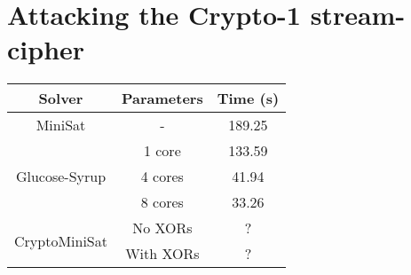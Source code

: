 \section{Attacking the Crypto-1 stream-cipher}
\begin{tabular}{|c|c|c|}
	\hline
	\textbf{Solver} & \textbf{Parameters} & \textbf{Time (s)} \\
	\hline
	MiniSat & - & 189.25 \\
	\hline
	\multirow{3}{*}{Glucose-Syrup} & 1 core & 133.59 \\ \cline{2-3}
	 & 4 cores & 41.94 \\ \cline{2-3}
	 & 8 cores & 33.26 \\
	 \hline
	 
	 \multirow{2}{*}{CryptoMiniSat} & No {XORs} & ? \\ \cline{2-3}
	 & With {XORs} & ? \\ \cline{2-3}
	 \hline
\end{tabular}